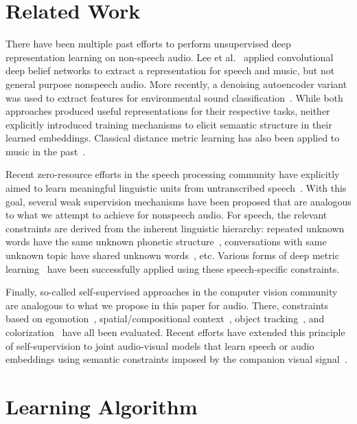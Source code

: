 \documentclass{article}
\begin{document}
\section{Related Work}

There have been multiple past efforts to perform unsupervised deep
representation learning on non-speech audio.  Lee et
al.~\cite{lee2009unsupervised} applied convolutional deep belief networks to
extract a representation for speech and music, but not general purpose nonspeech
audio.  More recently, a denoising autoencoder variant was used to extract
features for environmental sound classification~\cite{xu2017unsupervised}.
While both approaches produced useful representations for their respective
tasks, neither explicitly introduced training mechanisms to elicit semantic
structure in their learned embeddings. Classical distance metric learning has
also been applied to music in the past~\cite{slaney2008learning}.

Recent zero-resource efforts in the speech processing community have explicitly
aimed to learn meaningful linguistic units from untranscribed
speech~\cite{versteegh2015zero}.  With this goal, several weak supervision
mechanisms have been proposed that are analogous to what we attempt to achieve
for nonspeech audio.  For speech, the relevant constraints are derived from the
inherent linguistic hierarchy: repeated unknown words have the same unknown
phonetic structure~\cite{jansen2013weak}, conversations with same unknown topic
have shared unknown words~\cite{frank2014weak}, etc.  Various forms of deep
metric
learning~\cite{synnaeve2014phonetics,kamper2015unsupervised,zeghidour2016joint,kamper2016deep}
have been successfully applied using these speech-specific constraints.

Finally, so-called self-supervised approaches in the computer vision community
are analogous to what we propose in this paper for audio.  There, constraints
based on egomotion~\cite{agrawal2015learning}, spatial/compositional
context~\cite{pathak2016context,doersch2015unsupervised}, object
tracking~\cite{wang2015unsupervised}, and colorization~\cite{zhang2016colorful}
have all been evaluated.  Recent efforts have extended this principle of
self-supervision to joint audio-visual models that learn speech or audio
embeddings using semantic constraints imposed by the companion visual
signal~\cite{arandjelovic2017look,aytar2016soundnet,harwath2016unsupervised,kamper2017visually}.

\section{Learning Algorithm}
\label{sec:alg}
\end{document}
